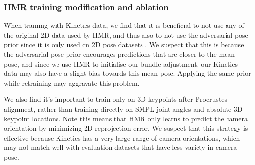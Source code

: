 \documentclass[10pt,twocolumn,letterpaper]{article}
\begin{document}
\subsubsection{HMR training modification and ablation}
\label{sec:exp_kinetics_ablation}

\begin{table}[t]
\caption{Ablation study of our HMR retraining schemes. 
	PA-only 3D means during our retraining of HMR, we discard the losses on SMPL joints and absolute 3D locations and only use losses on joints after Procrustes alignment.  
	No 2D means disabling all HMR datasets that contain only 2D data (and therefore disabling the adversarial prior which is only used on 2D datasets).
	}	
\end{table} 
When training with Kinetics data, we find that it is beneficial to not use any of the original 2D data used by HMR, and thus also to not use the adversarial pose prior since it is only used on 2D pose datasets \cite{kanazawa_cvpr_2018}.
We suspect that this is because the adversarial pose prior encourages predictions that are closer to the mean pose, and since we use HMR to initialise our bundle adjustment, our Kinetics data may also have a slight bias towards this mean pose.
Applying the same prior while retraining may aggravate this problem.

We also find it's important to train only on 3D keypoints after Procrustes alignment, rather than training directly on SMPL joint angles and absolute 3D keypoint locations.
Note this means that HMR only learns to predict the camera orientation by minimizing 2D reprojection error.  
We suspect that this strategy is effective because Kinetics has a very large range of camera orientations, which may not match well with evaluation datasets that have less variety in camera pose.
\end{document}
